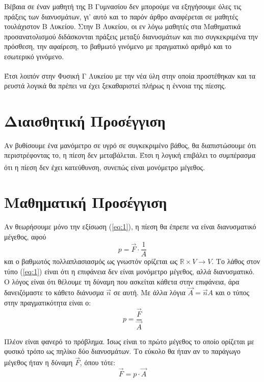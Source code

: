 \documentclass[12pt,titlepage]{article}
\begin{document}
Βέβαια σε έναν μαθητή της Β Γυμνασίου δεν μπορούμε να εξηγήσουμε όλες τις πράξεις των διανυσμάτων, γι' αυτό και το παρόν άρθρο αναφέρεται σε μαθητές τουλάχιστον Β Λυκείου. Στην Β Λυκείου, οι εν λόγω μαθητές στα Μαθηματικά προσανατολισμού διδάσκονται πράξεις μεταξύ διανυσμάτων και πιο συγκεκριμένα την πρόσθεση, την αφαίρεση, το βαθμωτό γινόμενο με πραγματικό αριθμό και το εσωτερικό γινόμενο.

Έτσι λοιπόν στην Φυσική Γ Λυκείου\textsuperscript{\cite{fysikiG}} με την νέα ύλη στην οποία προστέθηκαν και τα ρευστά λογικά θα πρέπει να έχει ξεκαθαριστεί πλήρως η έννοια της πίεσης.

\section{Διαισθητική Προσέγγιση}

Αν βυθίσουμε ένα μανόμετρο σε υγρό σε συγκεκριμένο βάθος, θα διαπιστώσουμε ότι περιστρέφοντας το, η πίεση δεν μεταβάλεται. Έτσι η λογική επιβάλει το συμπέρασμα ότι η πίεση δεν έχει κατεύθυνση, συνεπώς είναι μονόμετρο μέγεθος\textsuperscript{\cite{Halliday1}}.

\section{Μαθηματική Προσέγγιση}
Αν θεωρήσουμε μόνο την εξίσωση (\ref{eq:1}), η πίεση θα έπρεπε να είναι διανυσματικό μέγεθος, αφού
\begin{equation} \label{eq:4}
 p=\vec{F}\cdot\frac{1}{A}
\end{equation}
και ο βαθμωτός πολλαπλασιασμός ως γνωστόν ορίζεται ως $\mathbb{R} \times V \to V$. Το λάθος στον τύπο (\ref{eq:1}) είναι ότι η επιφάνεια δεν είναι μονόμετρο μέγεθος, αλλά διανυσματικό. Ο λόγος είναι ότι θέλουμε τη δύναμη που ασκείται κάθετα στην επιφάνεια, άρα δανειζόμαστε το κάθετο διάνυσμα $\vec{n}$ σε αυτή. Με άλλα λόγια $\vec{Α}=\vec{n}Α$ και ο τύπος στην πραγματικότητα είναι ο:
\begin{equation} \label{eq:2}
 p=\frac{\vec{F}}{\vec{A}}
\end{equation}

Πλέον είναι φανερό το πρόβλημα. Ίσως είναι το πρώτο μέγεθος το οποίο ορίζεται με φυσικό τρόπο ως πηλίκο δύο διανυσμάτων. Το εύκολο θα ήταν αν το παράγωγο μέγεθος ήταν η δύναμη $\vec{F}$, όπου τότε:
\begin{equation} \label{eq:3}
 \vec{F}=p\cdot \vec{A}
\end{equation}
\end{document}
